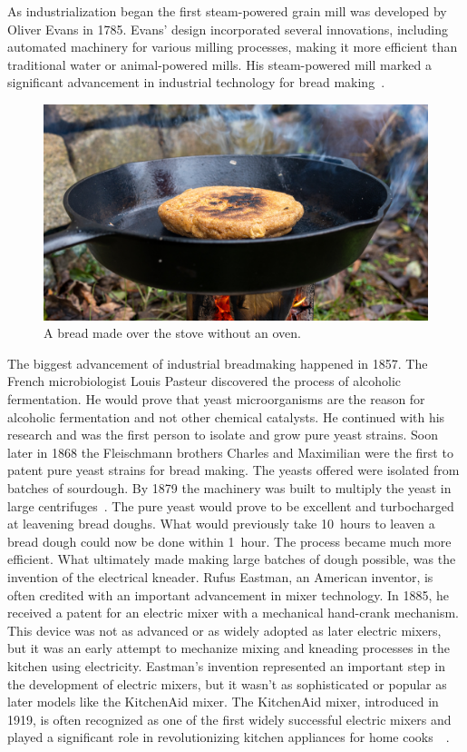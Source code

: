 As industrialization began the first steam-powered grain mill was developed by
Oliver Evans in \num{1785}. Evans' design incorporated several innovations,
including automated machinery for various milling processes, making it more
efficient than traditional water or animal-powered mills. His steam-powered
mill marked a significant advancement in industrial technology for bread
making~\cite{evans+mill}.

\begin{figure}[ht]
  \centering
  \includegraphics[width=\textwidth]{sourdough-stove}
  \caption{A bread made over the stove without an oven.}%
  \label{fig:sourdough-stove}
\end{figure}

The biggest advancement of industrial breadmaking happened in \num{1857}.
The French microbiologist Louis Pasteur discovered
the process of alcoholic fermentation. He would prove that
yeast microorganisms are the reason for alcoholic fermentation
and not other chemical catalysts. He continued with his research and
was the first person to isolate and grow pure yeast strains.
Soon later in \num{1868} the Fleischmann brothers Charles
and Maximilian were the first to patent pure yeast strains
for bread making. The yeasts offered
were isolated from batches of sourdough. By \num{1879} the machinery was built
to multiply the yeast in large centrifuges~\cite{fleischmann+history}.
The pure yeast would prove to be excellent and turbocharged
at leavening bread doughs. What would previously take 10~hours
to leaven a bread dough could now be done within 1~hour.
The process became much more efficient. What ultimately made making large
batches of dough possible, was the invention of the electrical kneader.  Rufus
Eastman, an American inventor, is often credited with an important advancement
in mixer technology. In \num{1885}, he received a patent for an electric mixer
with a mechanical hand-crank mechanism.  This device was not as advanced or as
widely adopted as later electric mixers, but it was an early attempt to
mechanize mixing and kneading processes in the kitchen using electricity.
Eastman's invention represented an important step in the development of
electric mixers, but it wasn't as sophisticated or popular as later models
like the KitchenAid mixer. The KitchenAid mixer, introduced in \num{1919}, is
often recognized as one of the first widely successful electric mixers and
played a significant role in revolutionizing kitchen appliances for home
cooks~\cite{first+mixer}~\cite{kitchenaid+history}.

